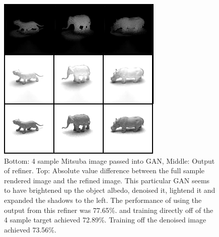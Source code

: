 \documentclass[10pt,twocolumn,letterpaper]{article}
\begin{document}
\begin{figure}[h!]
\centering
\includegraphics[width=1.0\columnwidth]{./assets/4sampleGANComparison_77_65.png}
\caption{Bottom: 4 sample Mitsuba image passed into GAN, Middle: Output of refiner.  Top: Absolute value difference between the full sample rendered image and the refined image. This particular GAN seems to have brightened up the object albedo, denoised it, lightend it and expanded the shadows to the left.  The performance of using the output from this refiner was 77.65\%. and training directly off of the 4 sample target achieved 72.89\%.  Training off the denoised image achieved 73.56\%.}
\label{fig:GAN_4}
\end{figure}
\end{document}

